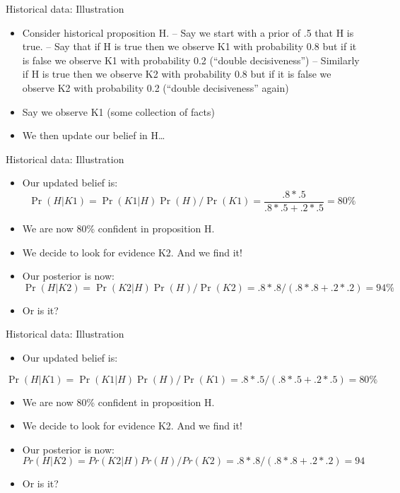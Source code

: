 \documentclass[
  11pt,
  ignorenonframetext,
]{beamer}
\providecommand{\tightlist}{%
  \setlength{\itemsep}{0pt}\setlength{\parskip}{0pt}}\usepackage{longtable,booktabs,array}
\begin{document}
\begin{frame}{Historical data: Illustration}
\protect\hypertarget{historical-data-illustration}{}
\begin{itemize}
\item
  Consider historical proposition H. -- Say we start with a prior of .5
  that H is true. -- Say that if H is true then we observe K1 with
  probability 0.8 but if it is false we observe K1 with probability 0.2
  (``double decisiveness'') -- Similarly if H is true then we observe K2
  with probability 0.8 but if it is false we observe K2 with probability
  0.2 (``double decisiveness'' again)
\item
  Say we observe K1 (some collection of facts)
\item
  We then update our belief in H\ldots{}
\end{itemize}
\end{frame}

\begin{frame}{Historical data: Illustration}
\protect\hypertarget{historical-data-illustration-1}{}
\begin{itemize}
\item
  Our updated belief is:
  \[\Pr(H|K1) = \Pr(K1|H)\Pr(H)/\Pr(K1) = \frac{.8*.5}{.8*.5+.2*.5}  = 80\%\]
\item
  We are now 80\% confident in proposition H.
\item
  We decide to look for evidence K2. And we find it!
\item
  Our posterior is now:
  \[\Pr(H|K2) = \Pr(K2|H)\Pr(H)/\Pr(K2) =.8*.8/(.8*.8+.2*.2)  = 94\%\]
\item
  Or is it?
\end{itemize}
\end{frame}

\begin{frame}{Historical data: Illustration}
\protect\hypertarget{historical-data-illustration-2}{}
\begin{itemize}
\tightlist
\item
  Our updated belief is:
\end{itemize}

\[\Pr(H|K1) = \Pr(K1|H)\Pr(H)/\Pr(K1) = .8*.5/(.8*.5+.2*.5)  = 80\%\]

\begin{itemize}
\item
  We are now 80\% confident in proposition H.
\item
  We decide to look for evidence K2. And we find it!
\item
  Our posterior is now:
  \[Pr(H|K2) = Pr(K2|H)Pr(H)/Pr(K2) =.8*.8/(.8*.8+.2*.2)  = 94%
  \]
\item
  Or is it?
\end{itemize}
\end{frame}
\end{document}
